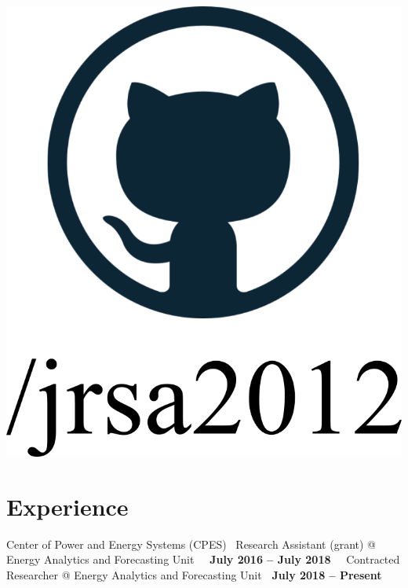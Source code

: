\documentclass{mycv}
\begin{document}
\begin{center}
	\href{https://github.com/jrsa2012}{\includegraphics[scale=0.06]{figs/github_logo_label.png}}
	
\end{center}


\section{Experience}


{Center of Power and Energy Systems (CPES) }
{\textbullet~Research Assistant (grant) \hspace{0.38cm} @ \hspace{0.02cm} Energy Analytics and Forecasting Unit \hfill ~\textbf{\ July 2016 -- July 2018\ }}
{\textbullet~Contracted Researcher \hspace{1cm}  @ \hspace{0.02cm} Energy Analytics and Forecasting Unit \hfill \textbf{ \ July 2018 -- Present\ }}


\vspace{0.4cm}
\end{document}
